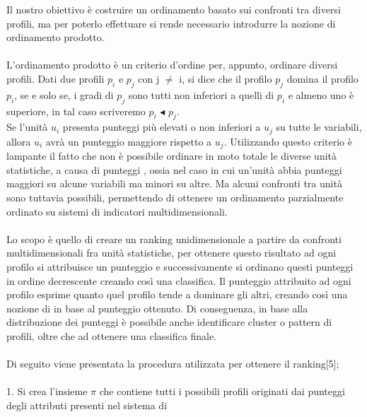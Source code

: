 \documentclass[a4paper,12pt, openright]{report}
\begin{document}
Il nostro obiettivo è costruire un ordinamento basato sui confronti tra diversi profili, ma per poterlo effettuare si rende necessario introdurre 
la nozione di ordinamento prodotto. \\
\\
L'ordinamento prodotto è un criterio d'ordine per, appunto, ordinare diversi profili. Dati due profili $p_{i}$ e $p_{j}$ con j $\neq$ i, si 
dice che il profilo $p_{j}$ domina il profilo $p_{i}$, se e solo se, i gradi di $p_{j}$ sono tutti non inferiori a quelli di $p_{i}$ e almeno
uno è superiore, in tal caso scriveremo $p_{i}$ $\blacktriangleleft $ $p_{j}$. \\
Se l'unità $u_{i}$ presenta punteggi più elevati o non inferiori a $u_{j}$ su tutte le variabili, allora $u_{i}$ avrà 
un punteggio maggiore rispetto a $u_{j}$. Utilizzando questo criterio è lampante il fatto che non è 
possibile ordinare in moto totale le diverse unità statistiche, a causa di punteggi , ossia
nel caso in cui un'unità abbia punteggi maggiori su alcune variabili ma minori su altre. Ma alcuni 
confronti tra unità sono tuttavia possibili, permettendo di ottenere un ordinamento parzialmente ordinato 
su sistemi di indicatori multidimensionali.\\
\\
Lo scopo è quello di creare un ranking unidimensionale a partire da confronti multidimensionali fra unità
statistiche, per ottenere questo risultato ad ogni profilo si attribuisce un punteggio e successivamente
si ordinano questi punteggi in ordine decrescente creando così una classifica. Il punteggio attribuito ad ogni profilo esprime quanto 
quel profilo tende a dominare gli altri, creando così una nozione di  in base al punteggio ottenuto. Di conseguenza, 
in base alla distribuzione dei punteggi è possibile anche identificare cluster o pattern di profili, oltre che ad ottenere una classifica 
finale. \\
\\
Di seguito viene presentata la procedura utilizzata per ottenere il ranking[5]; \\
\\
1. Si crea l'insieme $\pi$ che contiene tutti i possibili profili originati dai punteggi degli attributi presenti nel sistema di 
\end{document}
